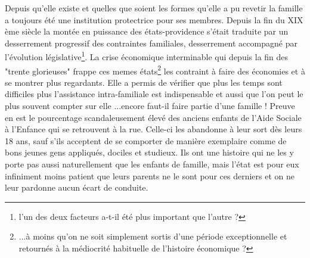 { Depuis qu'elle existe et quelles que soient les formes qu'elle a pu revetir la famille a toujours été une institution protectrice pour ses membres. Depuis la fin du XIX ème siècle la montée en puissance des états-providence s'était traduite par un desserrement progressif  des contraintes familiales, desserrement accompagné par l'évolution législative\footnote{l'un des deux facteurs a-t-il été plus important que l'autre ?}. La crise économique interminable qui depuis la fin des "trente glorieuses" frappe ces memes états\footnote{...à moins qu'on ne soit simplement sortis d'une période exceptionnelle et retournés à la médiocrité habituelle de l'histoire économique ?} les contraint à faire des économies et à se montrer plus regardants. Elle a permis de vérifier que plus les temps sont difficiles plus l'assistance intra-familiale est indispensable et aussi que l'on peut le plus souvent compter sur elle ...encore faut-il faire partie d'une famille ! Preuve en est le pourcentage scandaleusement élevé des anciens enfants de l'Aide Sociale à l'Enfance qui se retrouvent à la rue. Celle-ci les abandonne à leur sort dès leurs 18 ans, sauf s'ils acceptent de se comporter de manière exemplaire comme de bons jeunes gens appliqués, dociles et studieux. Ils ont une histoire qui ne les y porte pas aussi naturellement que les enfants de famille, mais l'état est pour eux infiniment moins patient que leurs parents ne le sont pour ces derniers et on ne leur pardonne aucun écart de conduite. 

}

